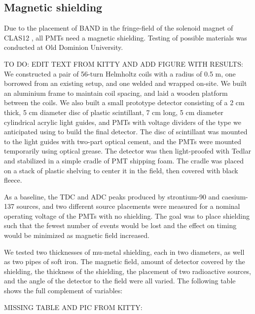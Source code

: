 \documentclass[3p,final,twocolumn]{elsarticle}
\begin{document}
\subsection{Magnetic shielding}

Due to the placement of BAND in the fringe-field of the solenoid magnet of CLAS12 \cite{Fair:2020yfx}, all PMTs need a magnetic shielding. Testing of possible materials was conducted at Old Dominion University. 

{\color{red}TO DO: EDIT TEXT FROM KITTY AND ADD FIGURE WITH RESULTS:
We constructed a pair of 56-turn Helmholtz coils with a radius of 0.5 m, one borrowed from an existing setup, and one welded and wrapped on-site. We built an aluminium frame to maintain coil spacing, and laid a wooden platform between the coils. We also built a small prototype detector consisting of a 2 cm thick, 5 cm diameter disc of plastic scintillant, 7 cm long, 5 cm diameter cylindrical acrylic light guides, and PMTs with voltage dividers of the type we anticipated using to build the final detector. The disc of scintillant was mounted to the light guides with two-part optical cement, and the PMTs were mounted temporarily using optical grease. The detector was then light-proofed with Tedlar and stabilized in a simple cradle of PMT shipping foam. The cradle was placed on a stack of plastic shelving to center it in the field, then covered with black fleece.

As a baseline, the TDC and ADC peaks produced by strontium-90 and caesium-137 sources, and two different source placements were measured for a nominal operating voltage of the PMTs with no shielding. The goal was to place shielding such that the fewest number of events would be lost and the effect on timing would be minimized as magnetic field increased.

We tested two thicknesses of mu-metal shielding, each in two diameters, as well as two pipes of soft iron. The magnetic field, amount of detector covered by the shielding, the thickness of the shielding, the placement of two radioactive sources, and the angle of the detector to the field were all varied. The following table shows the full complement of variables:}

{\color{red}MISSING TABLE AND PIC FROM KITTY:}

\end{document}

